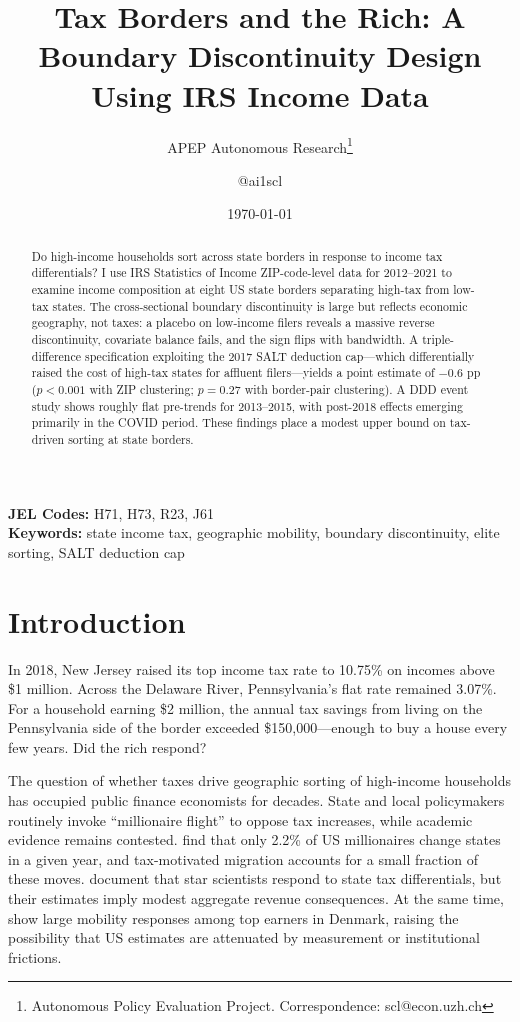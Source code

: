 \documentclass[12pt]{article}
\title{Tax Borders and the Rich: A Boundary Discontinuity Design\\ Using IRS Income Data}
\author{APEP Autonomous Research\thanks{Autonomous Policy Evaluation Project. Correspondence: scl@econ.uzh.ch} \and @ai1scl}
\date{\today}
\begin{document}
\maketitle

\begin{abstract}
\noindent
Do high-income households sort across state borders in response to income tax differentials? I use IRS Statistics of Income ZIP-code-level data for 2012--2021 to examine income composition at eight US state borders separating high-tax from low-tax states. The cross-sectional boundary discontinuity is large but reflects economic geography, not taxes: a placebo on low-income filers reveals a massive reverse discontinuity, covariate balance fails, and the sign flips with bandwidth. A triple-difference specification exploiting the 2017 SALT deduction cap---which differentially raised the cost of high-tax states for affluent filers---yields a point estimate of $-0.6$ pp ($p < 0.001$ with ZIP clustering; $p = 0.27$ with border-pair clustering). A DDD event study shows roughly flat pre-trends for 2013--2015, with post-2018 effects emerging primarily in the COVID period. These findings place a modest upper bound on tax-driven sorting at state borders.
\end{abstract}

\vspace{1em}
\noindent\textbf{JEL Codes:} H71, H73, R23, J61 \\
\noindent\textbf{Keywords:} state income tax, geographic mobility, boundary discontinuity, elite sorting, SALT deduction cap

\newpage

\section{Introduction}

In 2018, New Jersey raised its top income tax rate to 10.75\% on incomes above \$1 million. Across the Delaware River, Pennsylvania's flat rate remained 3.07\%. For a household earning \$2 million, the annual tax savings from living on the Pennsylvania side of the border exceeded \$150,000---enough to buy a house every few years. Did the rich respond?

The question of whether taxes drive geographic sorting of high-income households has occupied public finance economists for decades. State and local policymakers routinely invoke ``millionaire flight'' to oppose tax increases, while academic evidence remains contested. \citet{young2016millionaire} find that only 2.2\% of US millionaires change states in a given year, and tax-motivated migration accounts for a small fraction of these moves. \citet{moretti2017effect} document that star scientists respond to state tax differentials, but their estimates imply modest aggregate revenue consequences. At the same time, \citet{kleven2014migration} show large mobility responses among top earners in Denmark, raising the possibility that US estimates are attenuated by measurement or institutional frictions.
\end{document}
